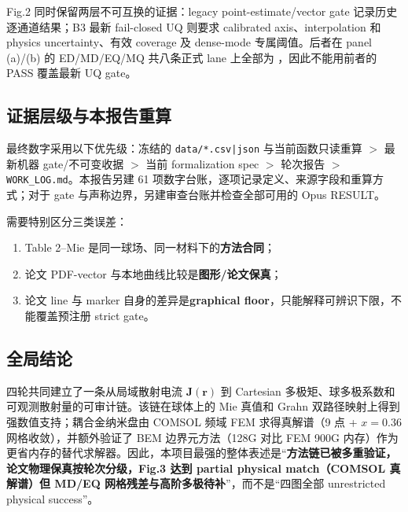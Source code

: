 Fig.2 同时保留两层不可互换的证据：legacy point-estimate/vector gate 记录历史逐通道结果；B3 最新 fail-closed UQ 则要求 calibrated axis、interpolation 和 physics uncertainty、有效 coverage 及 dense-mode 专属阈值。后者在 panel (a)/(b) 的 ED/MD/EQ/MQ 共八条正式 lane 上全部为 ，因此不能用前者的 PASS 覆盖最新 UQ gate。

\subsection{证据层级与本报告重算}

最终数字采用以下优先级：冻结的 \texttt{data/*.csv|json} 与当前函数只读重算 $>$ 最新机器 gate/不可变收据 $>$ 当前 formalization spec $>$ 轮次报告 $>$ \texttt{WORK\_LOG.md}。本报告另建 61 项数字台账，逐项记录定义、来源字段和重算方式；对于 gate 与声称边界，另建审查台账并检查全部可用的 Opus RESULT。

需要特别区分三类误差：
\begin{enumerate}
  \item Table 2--Mie 是同一球场、同一材料下的\textbf{方法合同}；
  \item 论文 PDF-vector 与本地曲线比较是\textbf{图形/论文保真}；
  \item 论文 line 与 marker 自身的差异是\textbf{graphical floor}，只能解释可辨识下限，不能覆盖预注册 strict gate。
\end{enumerate}

\subsection{全局结论}

四轮共同建立了一条从局域散射电流 $\mathbf J(\mathbf r)$ 到 Cartesian 多极矩、球多极系数和可观测散射量的可审计链。该链在球体上的 Mie 真值和 Grahn 双路径映射上得到强数值支持；耦合金纳米盘由 COMSOL 频域 FEM 求得真解谱（9 点 + $x=0.36$ 网格收敛），并额外验证了 BEM 边界元方法（128G 对比 FEM 900G 内存）作为更省内存的替代求解器。因此，本项目最强的整体表述是“\textbf{方法链已被多重验证，论文物理保真按轮次分级，Fig.3 达到 partial physical match（COMSOL 真解谱）但 MD/EQ 网格残差与高阶多极待补}”，而不是“四图全部 unrestricted physical success”。
